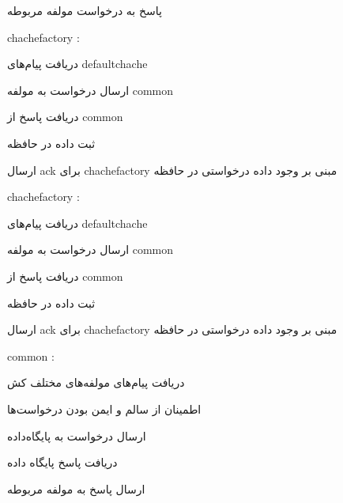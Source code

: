 \begin{itemize}
\begin{itemize}
		 پاسخ به درخواست مولفه مربوطه 

	\end{itemize}	

	

 chachefactory : 

\begin{itemize}

	 دریافت پیام‌های defaultchache

	 ارسال درخواست به مولفه common

	 دریافت پاسخ از common   

	 ثبت داده در حافظه

	 ارسال ack برای chachefactory مبنی بر وجود داده درخواستی در حافظه

\end{itemize}	





	

 chachefactory : 

\begin{itemize}

	 دریافت پیام‌های defaultchache

	 ارسال درخواست به مولفه common

	 دریافت پاسخ از common   

	 ثبت داده در حافظه

	 ارسال ack برای chachefactory مبنی بر وجود داده درخواستی در حافظه

\end{itemize}	



	

 common : 

\begin{itemize}

	 دریافت پیام‌های مولفه‌های مختلف کش

	 اطمینان از سالم و ایمن بودن درخواست‌ها

	 ارسال درخواست به پایگاه‌داده

	 دریافت پاسخ پایگاه داده

	 ارسال پاسخ به مولفه مربوطه

\end{itemize}	



\end{itemize}


